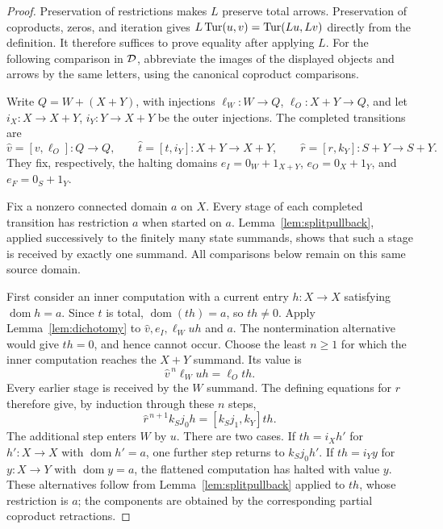 \documentclass[11pt]{article}
\newcommand{\dom}{\operatorname{dom}}\newcommand{\ran}{\operatorname{ran}}
\begin{document}
\begin{proof}
Preservation of restrictions makes $L$ preserve total arrows.
Preservation of coproducts, zeros, and iteration gives
$L\operatorname{Tur}(u,v)=\operatorname{Tur}(Lu,Lv)$ directly from the definition. It therefore
suffices to prove equality after applying $L$. For the following
comparison in $\mathcal D$, abbreviate the images of the displayed objects
and arrows by the same letters, using the canonical coproduct
comparisons.

Write $Q=W+(X+Y)$, with injections
$\ell_W:W\to Q$, $\ell_O:X+Y\to Q$, and let
$i_X:X\to X+Y$, $i_Y:Y\to X+Y$ be the outer injections. The
completed transitions are
\[
\widehat v=[v,\ell_O]:Q\to Q,\qquad
\widehat t=[t,i_Y]:X+Y\to X+Y,\qquad
\widehat r=[r,k_Y]:S+Y\to S+Y.
\]
They fix, respectively, the halting domains
$e_I=0_W+1_{X+Y}$, $e_O=0_X+1_Y$, and $e_F=0_S+1_Y$.

Fix a nonzero connected domain $a$ on $X$. Every stage of each
completed transition has restriction $a$ when started on $a$.
Lemma~\ref{lem:splitpullback}, applied successively to the finitely
many state summands, shows that such a stage is received by exactly
one summand. All comparisons below remain on this same source domain.

First consider an inner computation with a current entry
$h:X\to X$ satisfying $\dom h=a$. Since $t$ is total,
$\dom(th)=a$, so $th\ne0$. Apply Lemma~\ref{lem:dichotomy} to
$\widehat v,e_I,\ell_Wuh$ and $a$. The nontermination alternative
would give $th=0$, and hence cannot occur. Choose the least
$n\geq1$ for which the inner computation reaches the $X+Y$ summand.
Its value is
\begin{equation}\label{eq:flatten-inner-block}
\widehat v^{\,n}\ell_Wuh=\ell_Oth.
\end{equation}
Every earlier stage is received by the $W$ summand. The defining
equations for $r$ therefore give, by induction through these $n$ steps,
\begin{equation}\label{eq:flatten-full-block}
\widehat r^{\,n+1}k_Sj_0h=[k_Sj_1,k_Y]th.
\end{equation}
The additional step enters $W$ by $u$. There are two cases. If
$th=i_Xh'$ for $h':X\to X$ with $\dom h'=a$, one further step
returns to $k_Sj_0h'$. If $th=i_Yy$ for $y:X\to Y$ with
$\dom y=a$, the flattened computation has halted with value $y$.
These alternatives follow from Lemma~\ref{lem:splitpullback} applied
to $th$, whose restriction is $a$; the components are obtained by
the corresponding partial coproduct retractions.


\end{proof}
\end{document}
